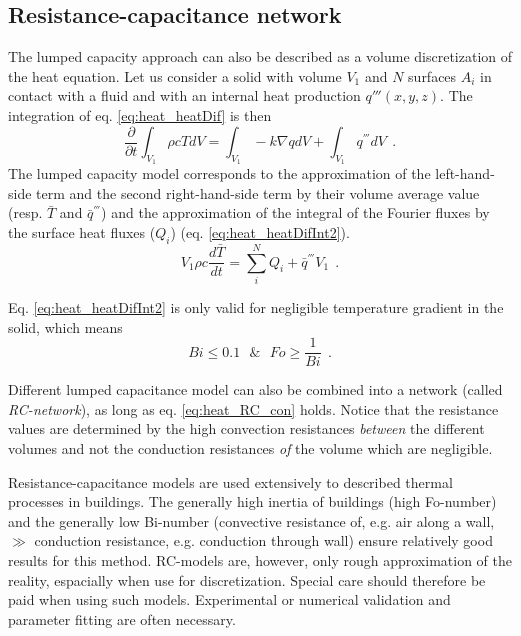 \documentclass[a4paper,oneside,11pt]{report}
\begin{document}
	\subsection{Resistance-capacitance network} \label{ssec:heat_net}
	
The lumped capacity approach can also be described as a volume discretization of the heat equation. Let us consider a solid with volume $V_1$ and $N$ surfaces $A_i$ in contact with a fluid and with an internal heat production $q'''(x,y,z)$. The integration of eq. \ref{eq:heat_heatDif} is then
\begin{equation} \label{eq:heat_heatDifInt}
	\frac{\partial }{\partial t} \int_{V_1} \rho c T dV = \int_{V_1} - k \nabla q dV + \int_{V_1} q^{'''} dV \ \ .
\end{equation}
The lumped capacity model corresponds to the approximation of the left-hand-side term and the second right-hand-side term by their volume average value (resp. $\bar{T}$ and $\bar{q}^{'''}$) and the approximation of the integral of the Fourier fluxes by the surface heat fluxes ($Q_i$) (eq. \ref{eq:heat_heatDifInt2}).
\begin{equation} \label{eq:heat_heatDifInt2}
	V_1 \rho c \frac{d\bar{T}}{dt} = \sum_{i}^{N} Q_i + \bar{q}^{'''} V_1 \ \ .
\end{equation}

Eq. \ref{eq:heat_heatDifInt2} is only valid for negligible temperature gradient in the solid, which means
\begin{equation} \label{eq:heat_RC_con}
	Bi \leq 0.1 \ \ \ \& \ \ \ Fo \geq \frac{1}{Bi} \ \ .
\end{equation}

Different lumped capacitance model can also be combined into a network (called \textit{RC-network}), as long as eq. \ref{eq:heat_RC_con} holds. Notice that the resistance values are determined by the high convection resistances \textit{between} the different volumes and not the conduction resistances \textit{of} the volume which are negligible.


Resistance-capacitance models are used extensively to described thermal processes in buildings. The generally high inertia of buildings (high Fo-number) and the generally low Bi-number (convective resistance of, e.g. air along a wall, $\gg$  conduction resistance, e.g. conduction through wall) ensure relatively good results for this method. RC-models are, however, only rough approximation of the reality, espacially when use for discretization. Special care should therefore be paid when using such models. Experimental or numerical validation and parameter fitting are often necessary. 
\end{document}
